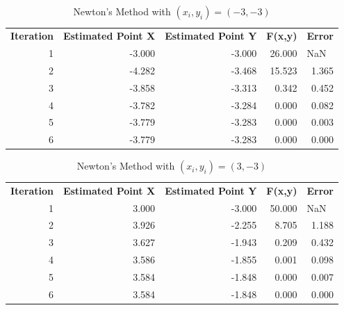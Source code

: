 \documentclass[12pt]{article}
\begin{document}
\begin{table}[h!]
  \centering
  \caption{Newton's Method with $(x_i,y_i) = (-3,-3)$}
    \begin{tabular}{rrrrr}
    \multicolumn{1}{l}{\textbf{Iteration }} & \multicolumn{1}{l}{\textbf{Estimated Point X}} & \multicolumn{1}{l}{\textbf{Estimated Point Y}} & \multicolumn{1}{l}{\textbf{F(x,y)}} & \multicolumn{1}{l}{\textbf{Error}} \\
    1     & -3.000 & -3.000 & 26.000 & \multicolumn{1}{l}{NaN} \\
    2     & -4.282 & -3.468 & 15.523 & 1.365 \\
    3     & -3.858 & -3.313 & 0.342 & 0.452 \\
    4     & -3.782 & -3.284 & 0.000 & 0.082 \\
    5     & -3.779 & -3.283 & 0.000 & 0.003 \\
    6     & -3.779 & -3.283 & 0.000 & 0.000 \\
    \end{tabular}%
\end{table}%
\begin{table}[H]
  \centering
  \caption{Newton's Method with $(x_i,y_i) = (3,-3)$}
    \begin{tabular}{rrrrr}
    \multicolumn{1}{l}{\textbf{Iteration }} & \multicolumn{1}{l}{\textbf{Estimated Point X}} & \multicolumn{1}{l}{\textbf{Estimated Point Y}} & \multicolumn{1}{l}{\textbf{F(x,y)}} & \multicolumn{1}{l}{\textbf{Error}} \\
    1     & 3.000 & -3.000 & 50.000 & \multicolumn{1}{l}{NaN} \\
    2     & 3.926 & -2.255 & 8.705 & 1.188 \\
    3     & 3.627 & -1.943 & 0.209 & 0.432 \\
    4     & 3.586 & -1.855 & 0.001 & 0.098 \\
    5     & 3.584 & -1.848 & 0.000 & 0.007 \\
    6     & 3.584 & -1.848 & 0.000 & 0.000 \\
    \end{tabular}%
\end{table}%
\end{document}
